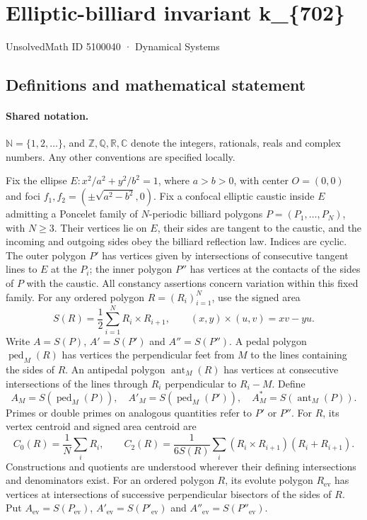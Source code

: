 \documentclass[11pt]{article}
\begin{document}
\setcounter{section}{5100039}
\section{Elliptic-billiard invariant k\_\{702\}}\label{5100040}
{\small\sffamily UnsolvedMath ID 5100040 · Dynamical Systems}
\subsection{Definitions and mathematical statement}

\paragraph{Shared notation.}$\mathbb N=\{1,2,\ldots\}$, and $\mathbb Z,\mathbb Q,\mathbb R,\mathbb C$ denote the integers, rationals, reals and complex numbers. Any other conventions are specified locally.


Fix the ellipse $E:x^2/a^2+y^2/b^2=1$, where $a>b>0$, with center $O=(0,0)$ and foci $f_1,f_2=(\pm\sqrt{a^2-b^2},0)$. Fix a confocal elliptic caustic inside $E$ admitting a Poncelet family of $N$-periodic billiard polygons $P=(P_1,\ldots,P_N)$, with $N\geq3$. Their vertices lie on $E$, their sides are tangent to the caustic, and the incoming and outgoing sides obey the billiard reflection law. Indices are cyclic. The outer polygon $P'$ has vertices given by intersections of consecutive tangent lines to $E$ at the $P_i$; the inner polygon $P''$ has vertices at the contacts of the sides of $P$ with the caustic. All constancy assertions concern variation within this fixed family.
For any ordered polygon $R=(R_i)_{i=1}^N$, use the signed area
\[S(R)=\frac12\sum_{i=1}^N R_i\times R_{i+1},\qquad (x,y)\times(u,v)=xv-yu.\]
Write $A=S(P)$, $A'=S(P')$ and $A''=S(P'')$. A pedal polygon $\operatorname{ped}_M(R)$ has vertices the perpendicular feet from $M$ to the lines containing the sides of $R$. An antipedal polygon $\operatorname{ant}_M(R)$ has vertices at consecutive intersections of the lines through $R_i$ perpendicular to $R_i-M$. Define
\[A_M=S(\operatorname{ped}_M(P)),\quad A'_M=S(\operatorname{ped}_M(P')),\quad A_M^*=S(\operatorname{ant}_M(P)).\]
Primes or double primes on analogous quantities refer to $P'$ or $P''$. For $R$, its vertex centroid and signed area centroid are
\[C_0(R)=\frac1N\sum_i R_i,\qquad C_2(R)=\frac{1}{6S(R)}\sum_i(R_i\times R_{i+1})(R_i+R_{i+1}).\]
Constructions and quotients are understood wherever their defining intersections and denominators exist.
For an ordered polygon $R$, its evolute polygon $R_{\mathrm{ev}}$ has vertices at intersections of successive perpendicular bisectors of the sides of $R$. Put $A_{\mathrm{ev}}=S(P_{\mathrm{ev}})$, $A'_{\mathrm{ev}}=S(P'_{\mathrm{ev}})$ and $A''_{\mathrm{ev}}=S(P''_{\mathrm{ev}})$.
\end{document}
